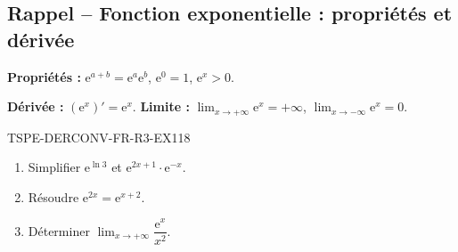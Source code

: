

\subsection*{Rappel -- Fonction exponentielle : propriétés et dérivée}

\textbf{Propriétés :} $\mathrm{e}^{a+b} = \mathrm{e}^a \mathrm{e}^b$, $\mathrm{e}^0 = 1$, $\mathrm{e}^x > 0$.

\textbf{Dérivée :} $(\mathrm{e}^x)' = \mathrm{e}^x$. \textbf{Limite :} $\lim_{x \to +\infty} \mathrm{e}^x = +\infty$, $\lim_{x \to -\infty} \mathrm{e}^x = 0$.

\begin{exercice}{TSPE-DERCONV-FR-R3-EX1}{1}{8}
\begin{enumerate}
  \item Simplifier $\mathrm{e}^{\ln 3}$ et $\mathrm{e}^{2x + 1} \cdot \mathrm{e}^{-x}$.
  \item Résoudre $\mathrm{e}^{2x} = \mathrm{e}^{x+2}$.
  \item Déterminer $\lim_{x \to +\infty} \dfrac{\mathrm{e}^x}{x^2}$.
\end{enumerate}
\end{exercice}

